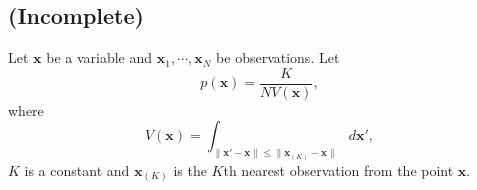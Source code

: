 \subsection{(Incomplete)}
\label{2.61}
Let $\mathbf{x}$ be a variable and $\mathbf{x}_1, \cdots, \mathbf{x}_N$ be observations.
Let
%
\begin{equation}
p(\mathbf{x})
=
\frac{K}{N V(\mathbf{x})},
\end{equation}
%
where
%
\begin{equation}
V(\mathbf{x})
=
\int_
{\lVert 
	\mathbf{x}' - \mathbf{x} 
\rVert
\leq 
\lVert
	\mathbf{x}_{(K)} - \mathbf{x}	
\rVert}
d\mathbf{x'},
\end{equation}
%
$K$ is a constant and $\mathbf{x}_{(K)}$ is the $K$th nearest observation from the point $\mathbf{x}$.














